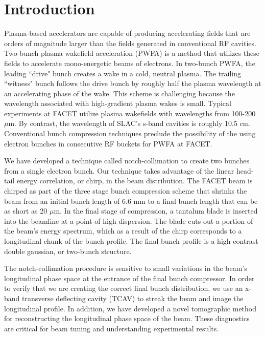 
\section{Introduction}
Plasma-based accelerators are capable of producing accelerating fields that are orders of magnitude larger than the fields generated in conventional RF cavities. Two-bunch plasma wakefield acceleration (PWFA) is a method that utilizes these fields to accelerate mono-energetic beams of electrons. In two-bunch PWFA, the leading ``drive" bunch creates a wake in a cold, neutral plasma. The trailing ``witness" bunch follows the drive bunch by roughly half the plasma wavelength at an accelerating phase of the wake. This scheme is challenging because the wavelength associated with high-gradient plasma wakes is small. Typical experiments at FACET utilize plasma wakefields with wavelengths from 100-200 $\mu$m. By contrast, the wavelength of SLAC's s-band cavities is roughly 10.5 cm. Conventional bunch compression techniques preclude the possibility of the using electron bunches in consecutive RF buckets for PWFA at FACET.

We have developed a technique called notch-collimation to create two bunches from a single electron bunch. Our technique takes advantage of the linear head-tail energy correlation, or chirp, in the beam distribution. The FACET beam is chirped as part of the three stage bunch compression scheme that shrinks the beam from an initial bunch length of 6.6 mm to a final bunch length that can be as short as 20 $\mu$m. In the final stage of compression, a tantalum blade is inserted into the beamline at a point of high dispersion. The blade cuts out a portion of the beam's energy spectrum, which as a result of the chirp corresponds to a longitudinal chunk of the bunch profile. The final bunch profile is a high-contrast double gaussian, or two-bunch structure.

The notch-collimation procedure is sensitive to small variations in the beam's longitudinal phase space at the entrance of the final bunch compressor. In order to verify that we are creating the correct final bunch distribution, we use an x-band transverse deflecting cavity (TCAV) to streak the beam and image the longitudinal profile. In addition, we have developed a novel tomographic method for reconstructing the longitudinal phase space of the beam. These diagnostics are critical for beam tuning and understanding experimental results.

